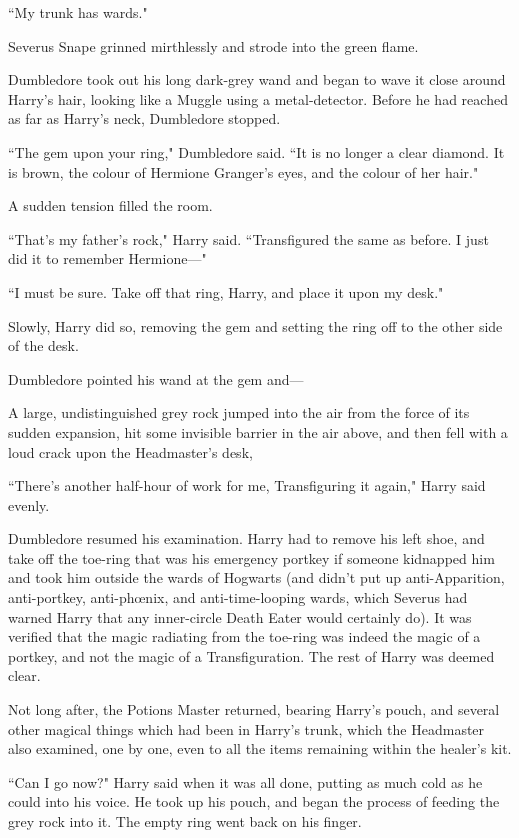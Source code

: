 ``My trunk has wards."

Severus Snape grinned mirthlessly and strode into the green flame.

Dumbledore took out his long dark-grey wand and began to wave it close around Harry's hair, looking like a Muggle using a metal-detector. Before he had reached as far as Harry's neck, Dumbledore stopped.

``The gem upon your ring," Dumbledore said. ``It is no longer a clear diamond. It is brown, the colour of Hermione Granger's eyes, and the colour of her hair."

A sudden tension filled the room.

``That's my father's rock," Harry said. ``Transfigured the same as before. I just did it to remember Hermione—"

``I must be sure. Take off that ring, Harry, and place it upon my desk."

Slowly, Harry did so, removing the gem and setting the ring off to the other side of the desk.

Dumbledore pointed his wand at the gem and—

A large, undistinguished grey rock jumped into the air from the force of its sudden expansion, hit some invisible barrier in the air above, and then fell with a loud crack upon the Headmaster's desk,

``There's another half-hour of work for me, Transfiguring it again," Harry said evenly.

Dumbledore resumed his examination. Harry had to remove his left shoe, and take off the toe-ring that was his emergency portkey if someone kidnapped him and took him outside the wards of Hogwarts (and didn't put up anti-Apparition, anti-portkey, anti-phœnix, and anti-time-looping wards, which Severus had warned Harry that any inner-circle Death Eater would certainly do). It was verified that the magic radiating from the toe-ring was indeed the magic of a portkey, and not the magic of a Transfiguration. The rest of Harry was deemed clear.

Not long after, the Potions Master returned, bearing Harry's pouch, and several other magical things which had been in Harry's trunk, which the Headmaster also examined, one by one, even to all the items remaining within the healer's kit.

``Can I go now?" Harry said when it was all done, putting as much cold as he could into his voice. He took up his pouch, and began the process of feeding the grey rock into it. The empty ring went back on his finger.

